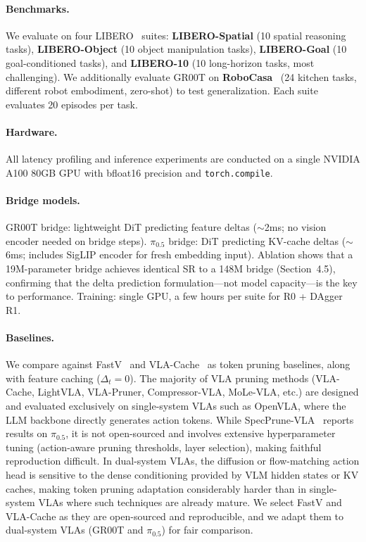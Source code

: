 \documentclass{article}
\begin{document}
\paragraph{Benchmarks.}
We evaluate on four LIBERO~\cite{liu2024libero} suites:
\textbf{LIBERO-Spatial} (10 spatial reasoning tasks),
\textbf{LIBERO-Object} (10 object manipulation tasks),
\textbf{LIBERO-Goal} (10 goal-conditioned tasks),
and \textbf{LIBERO-10} (10 long-horizon tasks, most challenging).
We additionally evaluate GR00T on \textbf{RoboCasa}~\cite{robocasa2024} (24 kitchen tasks, different robot embodiment, zero-shot) to test generalization.
Each suite evaluates 20 episodes per task.

\paragraph{Hardware.}
All latency profiling and inference experiments are conducted on a single NVIDIA A100 80GB GPU with bfloat16 precision and \texttt{torch.compile}.

\paragraph{Bridge models.}
GR00T bridge: lightweight DiT predicting feature deltas ($\sim$2ms; no vision encoder needed on bridge steps).
$\pi_{0.5}$ bridge: DiT predicting KV-cache deltas ($\sim$6ms; includes SigLIP encoder for fresh embedding input).
Ablation shows that a 19M-parameter bridge achieves identical SR to a 148M bridge (Section~4.5), confirming that the delta prediction formulation---not model capacity---is the key to performance.
Training: single GPU, a few hours per suite for R0 + DAgger R1.

\paragraph{Baselines.}
We compare against FastV~\cite{chen2024fastv} and VLA-Cache~\cite{xu2025vlacache} as token pruning baselines, along with feature caching ($\Delta_t{=}0$).
The majority of VLA pruning methods (VLA-Cache, LightVLA, VLA-Pruner, Compressor-VLA, MoLe-VLA, etc.) are designed and evaluated exclusively on single-system VLAs such as OpenVLA, where the LLM backbone directly generates action tokens.
While SpecPrune-VLA~\cite{wang2025specprune} reports results on $\pi_{0.5}$, it is not open-sourced and involves extensive hyperparameter tuning (action-aware pruning thresholds, layer selection), making faithful reproduction difficult.
In dual-system VLAs, the diffusion or flow-matching action head is sensitive to the dense conditioning provided by VLM hidden states or KV caches, making token pruning adaptation considerably harder than in single-system VLAs where such techniques are already mature.
We select FastV and VLA-Cache as they are open-sourced and reproducible, and we adapt them to dual-system VLAs (GR00T and $\pi_{0.5}$) for fair comparison.
\end{document}
